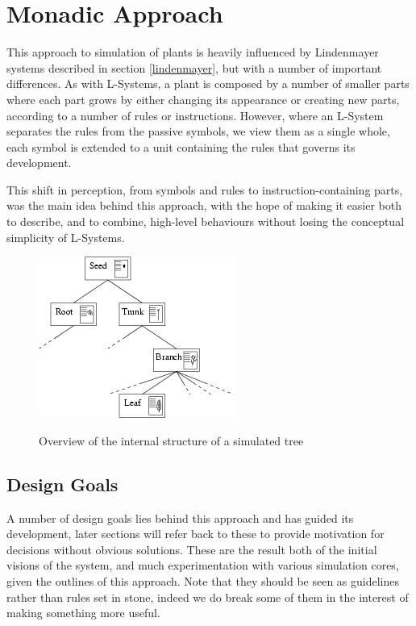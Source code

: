 \section{Monadic Approach}



    This approach to simulation of plants is heavily influenced by
    Lindenmayer systems described in section \ref{lindenmayer}, but
    with a number of important differences.  As with L-Systems, a
    plant is composed by a number of smaller parts where each part
    grows by either changing its appearance or creating new parts,
    according to a number of rules or instructions.
    However, where an L-System separates the rules from the passive
    symbols, we view them as a single whole, each symbol is extended
    to a unit containing the rules that governs its development.

    This shift in perception, from symbols and rules to
    instruction-containing parts, was the main idea behind this
    approach, with the hope of making it easier both to describe,
    and to combine, high-level behaviours without losing the
    conceptual simplicity of L-Systems.


\begin{figure}[hbt]
    \centering
    \includegraphics{images/tree_overview}
    \label{monadic:tree_overview}
    \caption{Overview of the internal structure of a simulated tree}
\end{figure}

\subsection{Design Goals}

    A number of design goals lies behind this approach and has guided
    its development, later sections will refer back to these to
    provide motivation for decisions without obvious solutions. These
    are the result both of the initial visions of the system, and much
    experimentation with various simulation cores, given the outlines
    of this approach. Note that they should be seen as guidelines
    rather than rules set in stone, indeed we do break some of them in
    the interest of making something more useful.

